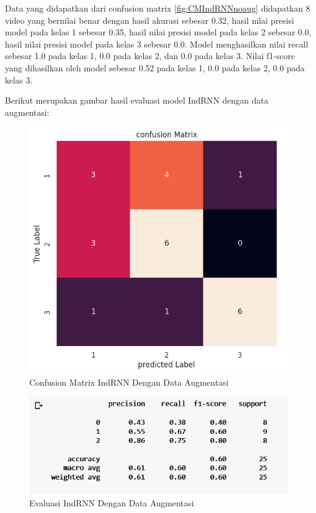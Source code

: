 Data yang didapatkan dari confusion matrix \ref{fig:CMIndRNNnoaug} didapatkan 8 video yang bernilai benar
dengan hasil akurasi sebesar 0.32, hasil nilai presisi model pada kelas 1 sebesar 0.35, hasil nilai
presisi model pada kelas 2 sebesar 0.0, hasil nilai presisi model pada kelas 3 sebesar 0.0. Model menghasilkan
nilai recall sebesar 1.0 pada kelas 1, 0.0 pada kelas 2, dan 0.0 pada kelas 3. Nilai f1-score yang dihasilkan
oleh model sebesar 0.52 pada kelas 1, 0.0 pada kelas 2, 0.0 pada kelas 3.

Berikut merupakan gambar hasil evaluasi model IndRNN  dengan data augmentasi:
\newpage
\begin{figure} [ht] \centering
  \includegraphics[scale=0.7]{gambar/CMIndRNNaug.png}
  \caption{Confusion Matrix IndRNN Dengan Data Augmentasi}
  \label{fig:CMIndRNNaug}
\end{figure}

\begin{figure} [ht] \centering
  \includegraphics[scale=0.55]{gambar/scoreIndRNNaug.png}
  \caption{Evaluasi IndRNN Dengan Data Augmentasi}
  \label{fig:ScoreIndRNNaug}
\end{figure}

